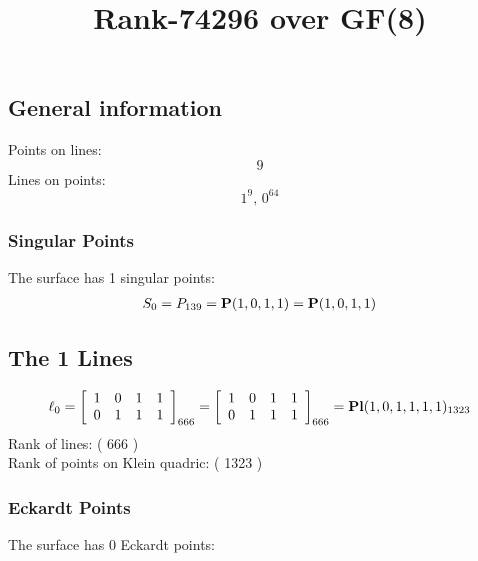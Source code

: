 \documentclass{article}
\newcommand\setTBstruts{\def\T{\rule{0pt}{2.6ex}}%
\def\B{\rule[-1.2ex]{0pt}{0pt}}}
\newcommand{\bP}{{\bf P}}
\begin{document}
 
\setTBstruts



{\allowdisplaybreaks%






\title{Rank-74296 over GF(8)}
\author{}%
\maketitle%
%
{}



\subsection*{General information}
Points on lines:
$$
9$$
Lines on points:
$$
1^9,\,0^{64}$$
\subsubsection*{Singular Points}
The surface has 1 singular points:\\
\begin{align*}
S_{0} &= P_{139}=\bP(1, 0, 1, 1) = \bP(1, 0, 1, 1)\\
\end{align*}
\subsection*{The 1 Lines}
$$
\ell_{0} = 
\left[
\begin{array}{*{4}{r}}
1 & 0 & 1 & 1\\
0 & 1 & 1 & 1\\
\end{array}
\right]
_{666}
=
\left[
\begin{array}{*{4}c}
1  & 0  & 1  & 1\\
0  & 1  & 1  & 1\\
\end{array}
\right]_{666}
={\rm\bf Pl}(1,0,1,1,1,1 )_{1323}$$
Rank of lines: ( 666 )\\
Rank of points on Klein quadric: ( 1323 )\\
\subsubsection*{Eckardt Points}
The surface has 0 Eckardt points:\\
}
\end{document}
